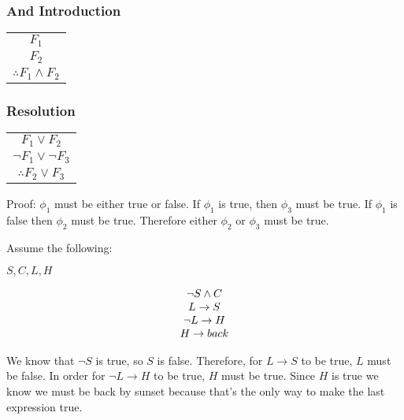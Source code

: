 \documentclass[8pt]{scrreprt}
\begin{document}
\begin{landscape}
\begin{multicols*}{3}
\subsubsection{And Introduction}

\begin{center}
	\begin{tabular}{c}
		$F_1$                     \\
		$F_2$                     \\
		\hline
		$\therefore F_1\land F_2$ \\
	\end{tabular}
\end{center}

\subsubsection{Resolution}

\begin{center}
	\begin{tabular}{c}
		$F_1\lor F_2$            \\
		$\neg F_1\lor \neg F_3$  \\
		\hline
		$\therefore F_2\lor F_3$ \\
	\end{tabular}
\end{center}

Proof: $\phi_1$ must be either true or false. If $\phi_1$ is true, then $\phi_3$
must be true. If $\phi_1$ is false then $\phi_2$ must be true. Therefore either
$\phi_2$ or $\phi_3$ must be true.

\begin{example}
	Assume the following:

	$S, C, L, H$

	\[
		\begin{tabular}{c}
			$\neg S \land C$      \\
			$L\rightarrow S$      \\
			$\neg L\rightarrow H$ \\
			$H\rightarrow back$
		\end{tabular}
	\]

	We know that $\neg S$ is true, so $S$ is false. Therefore, for $L\rightarrow S$
	to be true, $L$ must be false. In order for $\neg L\rightarrow H$ to be true, $H$ must be true.
	Since $H$ is true we know we must be back by sunset because that's the only way to make
	the last expression true.
\end{example}


\end{multicols*}
\end{landscape}
\end{document}
